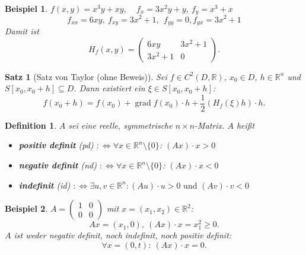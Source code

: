 \documentclass[12pt]{extreport} %
\newcommand{\R}{\mathbb{R}}
\theoremstyle{named}
\theoremstyle{nnamed}
\theoremstyle{itshape}
\newtheorem{satz}[unnamedtheorem]{Satz}
\newtheorem*{definition}{Definition}
\theoremstyle{normal}
\newtheorem*{beispiel*}{Beispiel}
\begin{document}
\begin{beispiel*}
	$f(x, y) = x^{3} y + x y$, ~ $f_{x} = 3 x^{2} y + y$, $f_{y} = x^{3} + x$
	$$ f_{xx} = 6xy, ~ f_{xy} = 3x^{2} + 1, ~ ~ f_{yy} = 0, f_{yx} = 3 x^{2} + 1 $$	
	Damit ist
	$$ H_{f} (x, y) = \begin{pmatrix} 6 xy & 3 x^{2} + 1 \\ 3x^{2} + 1 & 0 \end{pmatrix}. $$
\end{beispiel*}


\begin{satz}[Satz von Taylor (ohne Beweis)] \label{18.8:satz} %
	Sei $f \in C^{2}(D, \R)$, $x_{0} \in D$, $h \in \R^{n}$ und $S[x_{0}, x_{0} + h] \subseteq D$. Dann existiert ein $\xi \in S[x_{0}, x_{0} + h]$:
	$$ f(x_{0} + h) = f(x_{0}) + \operatorname{grad} f(x_{0}) \cdot h + \frac{1}{2} \left( H_{f}(\xi) h \right) \cdot h. $$	
\end{satz}

    
\begin{definition}
	$A$ sei eine reelle, symmetrische $n \times n$-Matrix. $A$ hei{\ss}t
	\begin{itemize}
		\item \textbf{positiv definit} (pd) $: \iff \forall x \in \R^{n} \setminus \{ 0 \}$: $\left( A x \right) \cdot x > 0$
		\item \textbf{negativ definit} (nd) $: \iff \forall x \in \R^{n} \setminus \{ 0 \}$: $\left( A x \right) \cdot x < 0$
		\item \textbf{indefinit} (id) $: \iff \exists u, v \in \R^{n}: \left( A u \right) \cdot u > 0 \text{ und } \left( A v \right) \cdot v < 0$
	\end{itemize}
\end{definition}


\begin{beispiel*}
	$A = \begin{pmatrix} 1 & 0 \\ 0 & 0 \end{pmatrix}$ mit $x = (x_{1}, x_{2}) \in \R^{2}$:
	$$ Ax = (x_{1}, 0), ~ \left( A x \right) \cdot x = x_{1}^{2} \geq 0. $$
	$A$ ist weder negativ definit, noch indefinit, noch positiv definit: 
	$$ \forall x = (0, t): ~ \left( Ax \right) \cdot x = 0. $$ 
\end{beispiel*}
\end{document}
